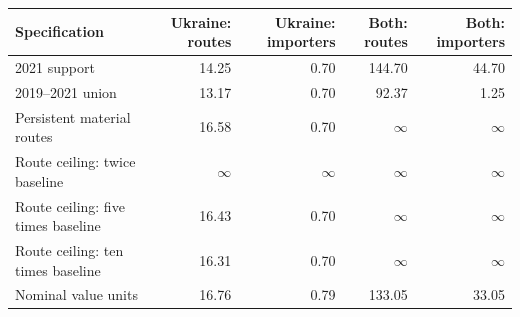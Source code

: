 \begin{tabular}{lrrrr}
\toprule
Specification & Ukraine: routes & Ukraine: importers & Both: routes & Both: importers \\
\midrule
2021 support & 14.25 & 0.70 & 144.70 & 44.70 \\
2019--2021 union & 13.17 & 0.70 & 92.37 & 1.25 \\
Persistent material routes & 16.58 & 0.70 & $\infty$ & $\infty$ \\
Route ceiling: twice baseline & $\infty$ & $\infty$ & $\infty$ & $\infty$ \\
Route ceiling: five times baseline & 16.43 & 0.70 & $\infty$ & $\infty$ \\
Route ceiling: ten times baseline & 16.31 & 0.70 & $\infty$ & $\infty$ \\
Nominal value units & 16.76 & 0.79 & 133.05 & 33.05 \\
\bottomrule
\end{tabular}
